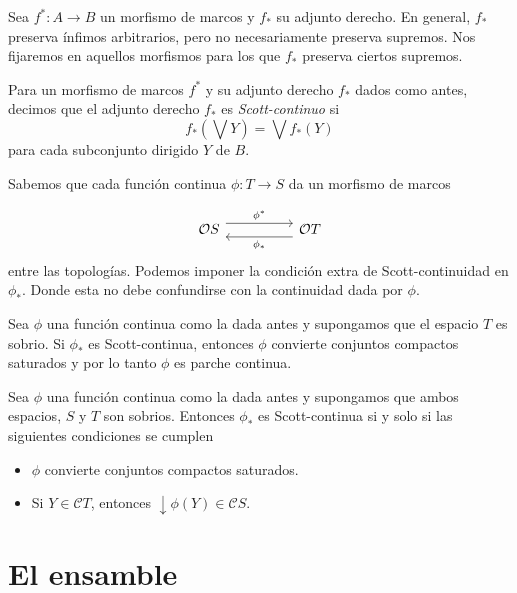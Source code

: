 Sea $f^*\colon A\to B$ un morfismo de marcos y $f_*$ su adjunto derecho. En general, $f_*$ preserva ínfimos arbitrarios, pero no necesariamente preserva supremos. Nos fijaremos en aquellos morfismos para los que $f_*$ preserva ciertos supremos.\\

\begin{dfn}\label{Scottcontino}
    Para un morfismo de marcos $f^*$ y su adjunto derecho $f_*$ dados como antes, decimos que el adjunto derecho $f_*$ es \emph{Scott-continuo} si 
    \[
    f_*(\bigvee Y)=\bigvee f_*(Y)
    \]
    para cada subconjunto dirigido $Y$ de $B$.
\end{dfn}

Sabemos que cada función continua $\phi\colon T\to S$ da un morfismo de marcos 

\[\begin{tikzcd}
	{\mathcal{O}S} && {\mathcal{O}T}
	\arrow["{\phi^*}", shift left=2, from=1-1, to=1-3]
	\arrow["{\phi_*}", shift left=2, from=1-3, to=1-1]
\end{tikzcd}\]
entre las topologías. Podemos imponer la condición extra de Scott-continuidad en $\phi_*$. Donde esta no debe confundirse con la continuidad dada por $\phi$.

\begin{lem}\label{Pcontinua y Scontinua}
    Sea $\phi$ una función continua como la dada antes y supongamos que el espacio $T$ es sobrio. Si $\phi_*$ es Scott-continua, entonces $\phi$ convierte conjuntos compactos saturados y por lo tanto $\phi$ es parche continua.
\end{lem}

\begin{thm}
    Sea $\phi$ una función continua como la dada antes y supongamos que ambos espacios, $S$ y $T$ son sobrios. Entonces $\phi_*$ es Scott-continua si y solo si las siguientes condiciones se cumplen
    \begin{itemize}
        \item $\phi$ convierte conjuntos compactos saturados.
        \item Si $Y\in \mathcal{C}T$, entonces $\downarrow \phi(Y)\in \mathcal{C}S$.
    \end{itemize}
\end{thm}

\section{El ensamble}

